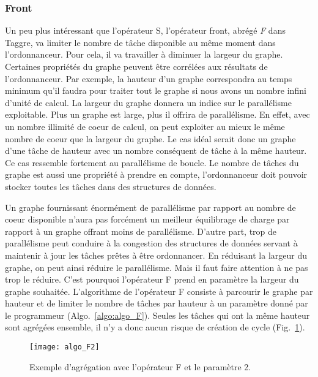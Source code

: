 \subsubsection{Front}
Un peu plus intéressant que l'opérateur S, l'opérateur front, abrégé {\em F} dans Taggre, va limiter le nombre de tâche disponible au même moment dans l'ordonnanceur.
%
Pour cela, il va travailler à diminuer la largeur du graphe.
%
Certaines propriétés du graphe peuvent être corrélées aux résultats de l'ordonnanceur.
%
Par exemple, la hauteur d'un graphe correspondra au temps minimum qu'il faudra pour traiter tout le graphe si nous avons un nombre infini d'unité de calcul.
%
La largeur du graphe donnera un indice sur le parallélisme exploitable.
%
Plus un graphe est large, plus il offrira de parallélisme.
%
En effet, avec un nombre illimité de coeur de calcul, on peut exploiter au mieux le même nombre de coeur que la largeur du graphe.
%
Le cas idéal serait donc un graphe d'une tâche de hauteur avec un nombre conséquent de tâche à la même hauteur.
%
Ce cas ressemble fortement au parallélisme de boucle.
%
Le nombre de tâches du graphe est aussi une propriété à prendre en compte, l'ordonnanceur doit pouvoir stocker toutes les tâches dans des structures de données.



Un graphe fournissant énormément de parallélisme par rapport au nombre de coeur disponible n'aura pas forcément un meilleur équilibrage de charge par rapport à un graphe offrant moins de parallélisme.
%
D'autre part, trop de parallélisme peut conduire à la congestion des structures de données servant à maintenir à jour les tâches prêtes à être ordonnancer.
%
En réduisant la largeur du graphe, on peut ainsi réduire le parallélisme.
%
Mais il faut faire attention à ne pas trop le réduire.
%
C'est pourquoi l'opérateur F prend en paramètre la largeur du graphe souhaitée.
%
L'algorithme de l'opérateur F consiste à parcourir le graphe par hauteur et de limiter le nombre de tâches par hauteur à un paramètre donné par le programmeur (Algo.~\ref{algo:algo_F}).
%
Seules les tâches qui ont la même hauteur sont agrégées ensemble, il n'y a donc aucun risque de création de cycle (Fig.~\ref{fig:algo_F2}).


\begin{figure}[t!]
  \centering
  \texttt{[image: algo\_F2]}
  \caption{Exemple d'agrégation avec l'opérateur F et le paramètre 2.}
  \label{fig:algo_F2}
\end{figure}

